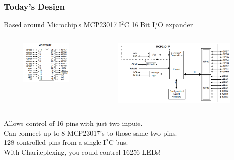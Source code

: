 \documentclass[t]{beamer}
\begin{document}
\begin{frame}
\frametitle{Today's Design}
Based around Microchip's MCP23017 I$^2$C 16 Bit I/O expander

\begin{columns}[c]
	\begin{figure}
		\includegraphics[width=1\linewidth]{mcp23071pinout.PNG}
	\end{figure}
	
	\begin{figure}
		\includegraphics[width=1\linewidth]{mcpFunctional.png}
	\end{figure}
\end{columns}
\vspace{7mm}
Allows control of 16 pins with just two inputs.\\
Can connect up to 8 MCP23017's to those same two pins.\\
128 controlled pins from a single I$^2$C bus.\\
With Charileplexing, you could control 16256 LEDs!

\end{frame}
\end{document}

